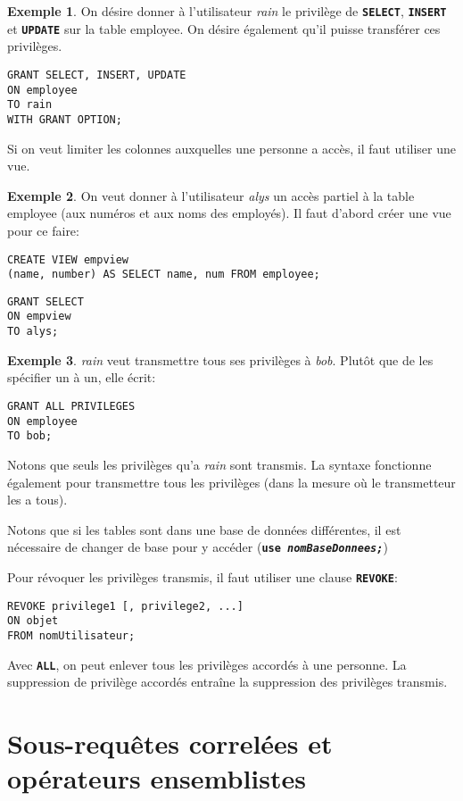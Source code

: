\documentclass[a4paper, 12pt]{report}
\newcommand{\textSQL}[1]{\texttt{\textbf{#1}}}
\theoremstyle{definition} \newtheorem{ex}{Exemple}
\begin{document}
\begin{ex}
On désire donner à l'utilisateur \emph{rain} le privilège de \textSQL{SELECT}, \textSQL{INSERT} et \textSQL{UPDATE} sur la table employee. On désire également qu'il puisse transférer ces privilèges.
 \begin{lstlisting}[frame=single]
GRANT SELECT, INSERT, UPDATE 
ON employee
TO rain
WITH GRANT OPTION;
\end{lstlisting}
\end{ex}

Si on veut limiter les colonnes auxquelles une personne a accès, il faut utiliser une vue.
\begin{ex}
On veut donner à l'utilisateur \emph{alys} un accès partiel à la table employee (aux numéros et aux noms des employés). Il faut d'abord créer une vue pour ce faire:
\begin{lstlisting}[frame=single]
CREATE VIEW empview
(name, number) AS SELECT name, num FROM employee;
\end{lstlisting}
\begin{lstlisting}[frame=single]
GRANT SELECT
ON empview
TO alys;
\end{lstlisting}
\end{ex}

\begin{ex}
\emph{rain} veut transmettre tous ses privilèges à \emph{bob}. Plutôt que de les spécifier un à un, elle écrit:
\begin{lstlisting}[frame=single]
GRANT ALL PRIVILEGES
ON employee
TO bob;
\end{lstlisting}
Notons que seuls les privilèges qu'a \emph{rain} sont transmis. La syntaxe fonctionne également pour transmettre tous les privilèges (dans la mesure où le transmetteur les a tous).
\end{ex}

Notons que si les tables sont dans une base de données différentes, il est nécessaire de changer de base pour y accéder (\textSQL{use \emph{nomBaseDonnees;}})

Pour révoquer les privilèges transmis, il faut utiliser une clause \textSQL{REVOKE}:
\begin{lstlisting}[frame=single]
REVOKE privilege1 [, privilege2, ...]
ON objet
FROM nomUtilisateur;
\end{lstlisting}
Avec \textSQL{ALL}, on peut enlever tous les privilèges accordés à une personne. La suppression de privilège accordés entraîne la suppression des privilèges transmis.

\chapter{Sous-requêtes correlées et opérateurs ensemblistes}
\end{document}
